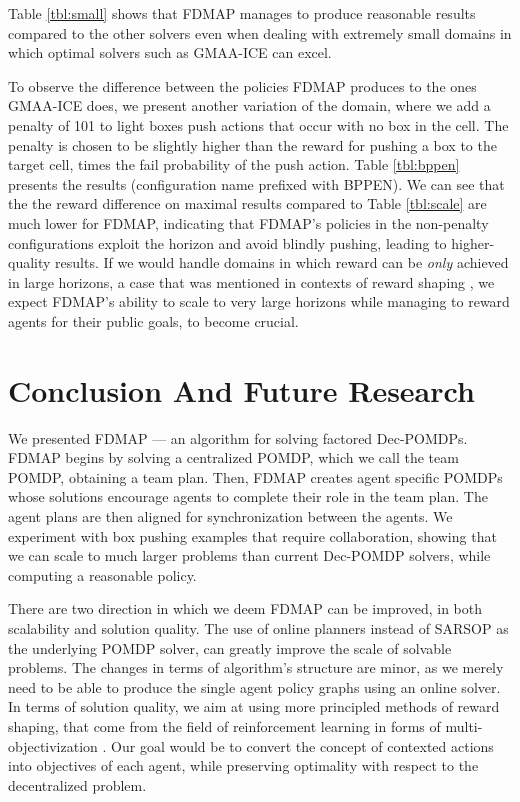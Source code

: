 \documentclass[letterpaper]{article} %
\theoremstyle{definition}
\begin{document}
Table \ref{tbl:small} shows that FDMAP manages to produce reasonable results compared to the other solvers even when dealing with extremely small domains in which optimal solvers such as GMAA-ICE can excel.

To observe the difference between the policies FDMAP produces to the ones GMAA-ICE does, we present another variation of the domain, where we add a penalty of 101 to light boxes push actions that occur with no box in the cell. The penalty is chosen to be slightly higher than the reward for pushing a box to the target cell, times the fail probability of the push action. Table \ref{tbl:bppen} presents the results (configuration name prefixed with BPPEN). We can see that the the reward difference on maximal results compared to Table \ref{tbl:scale} are much lower for FDMAP,
indicating that FDMAP's policies in the non-penalty configurations exploit the horizon and avoid blindly pushing, leading to higher-quality results.
If we would handle domains in which reward can be \emph{only} achieved in large horizons, a case that was mentioned in contexts of reward shaping \cite{REWARDSHAPING,REWARDSHAPING2}, we expect FDMAP's ability to scale to very large horizons while managing to reward agents for their public goals, to become crucial.

\section{Conclusion And Future Research}
We presented FDMAP --- an algorithm for solving factored Dec-POMDPs. FDMAP begins by solving a centralized POMDP, which we call the team POMDP, obtaining a team plan. Then, FDMAP creates agent specific POMDPs whose solutions encourage agents to complete their role in the team plan. The agent plans are then aligned for synchronization between the agents. We experiment with box pushing examples that require collaboration, showing that we can scale to much larger problems than current Dec-POMDP solvers, while computing a reasonable policy.

There are two direction in which we deem FDMAP can be improved, in both scalability and solution quality.
The use of online planners instead of SARSOP as the underlying POMDP solver, can greatly improve the scale of solvable problems. The changes in terms of algorithm's structure are minor, as we merely need to be able to produce the single agent policy graphs using an online solver.
In terms of solution quality, we aim at using more principled methods of reward shaping, that come from the field of reinforcement learning in forms of multi-objectivization \cite{REWARDSHAPING}.
Our goal would be to convert the concept of contexted actions into objectives of each agent, while preserving optimality with respect to the decentralized problem.



\end{document}
